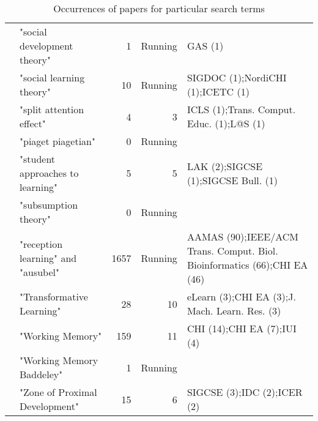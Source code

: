 \begin{table*}[t]
\begin{tabular}{lp{7cm}rrp{3cm}}
& "social development theory" & 1 & Running & GAS  (1) \\
& "social learning theory" & 10 & Running & SIGDOC  (1);NordiCHI  (1);ICETC  (1) \\
& "split attention effect" & 4 & 3 & ICLS  (1);Trans. Comput. Educ. (1);L@S  (1) \\
& "piaget piagetian" & 0 & Running &  \\
& "student approaches to learning" & 5 & 5 & LAK  (2);SIGCSE  (1);SIGCSE Bull. (1) \\
& "subsumption theory" & 0 & Running &  \\
& "reception learning" and "ausubel" & 1657 & Running & AAMAS  (90);IEEE/ACM Trans. Comput. Biol. Bioinformatics (66);CHI EA  (46) \\
& "Transformative Learning" & 28 & 10 & eLearn (3);CHI EA  (3);J. Mach. Learn. Res. (3) \\
& "Working Memory" & 159 & 11 & CHI  (14);CHI EA  (7);IUI  (4) \\
& "Working Memory Baddeley" & 1 & Running &  \\
& "Zone of Proximal Development" & 15 & 6 & SIGCSE  (3);IDC  (2);ICER  (2) \\
\end{tabular}
\caption{Occurrences of papers for particular search terms}
\end{table*}